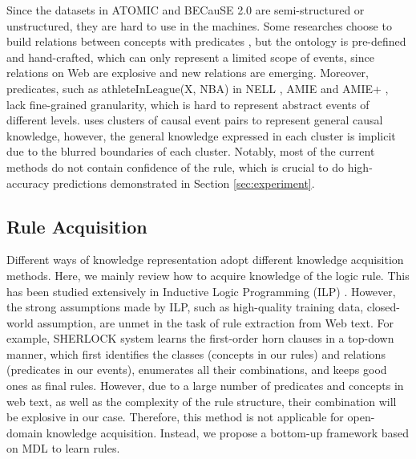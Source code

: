 Since the datasets in ATOMIC \cite{sap2018atomic} and BECauSE 2.0 \cite{Dunietz2017} are semi-structured or unstructured, they are hard to use in the machines.
Some researches choose to build relations between concepts with predicates \cite{schoenmackers2010learning, carlson2010toward}, but the ontology is pre-defined and hand-crafted, which can only represent a limited scope of events, since relations on Web are explosive and new relations are emerging. Moreover, predicates, such as athleteInLeague(X, NBA) in NELL \cite{carlson2010toward}, AMIE \cite{Galarraga2013} and AMIE+ \cite{Galarraga2015}, lack fine-grained granularity, which is hard to represent abstract events of different levels. 
\cite{Radinsky2012} uses clusters of causal event pairs to represent general causal knowledge, however, the general knowledge expressed in each cluster is implicit due to the blurred boundaries of each cluster.  
Notably, most of the current methods do not contain confidence of the rule, which is crucial to do high-accuracy predictions demonstrated in Section \ref{sec:experiment}.

\subsection{Rule Acquisition} 
Different ways of knowledge representation adopt different knowledge acquisition methods.
Here, we mainly review how to acquire knowledge of the logic rule. 
This has been studied extensively in Inductive Logic Programming (ILP) \cite{Quinlan1990,Muggleton1997}. However, the strong assumptions made by ILP, such as high-quality training data, closed-world assumption, are unmet in the task of rule extraction from Web text.
For example, SHERLOCK system \cite{schoenmackers2010learning} learns the first-order horn clauses in a top-down manner, which first identifies the classes (concepts in our rules) and relations (predicates in our events), enumerates all their combinations, and keeps good ones as final rules. 
However, due to a large number of predicates and concepts in web text, as well as the complexity of the rule structure, their combination will be explosive in our case. Therefore, this method is not applicable for open-domain knowledge acquisition. Instead, we propose a bottom-up framework based on MDL to learn rules.

